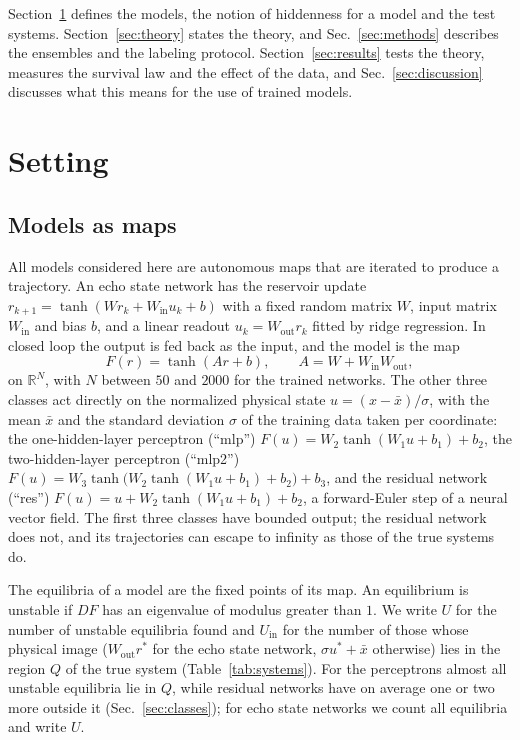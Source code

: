 \documentclass[aip,cha,reprint,amsmath,amssymb,longbibliography]{revtex4-2}
\theoremstyle{definition}
\newcommand{\Uin}{U_{\mathrm{in}}}
\begin{document}
Section~\ref{sec:setting} defines the models, the notion of hiddenness for a model and the test systems.
Section~\ref{sec:theory} states the theory, and Sec.~\ref{sec:methods} describes the ensembles and the labeling protocol.
Section~\ref{sec:results} tests the theory, measures the survival law and the effect of the data, and
Sec.~\ref{sec:discussion} discusses what this means for the use of trained models.

\section{Setting}
\label{sec:setting}

\subsection{Models as maps}
\label{sec:models}

All models considered here are autonomous maps that are iterated to produce a trajectory. An echo state
network\cite{Jaeger2001EchoState,LukoseviciusJaeger2009Reservoir} has the reservoir update
$r_{k+1}=\tanh(Wr_k+W_{\mathrm{in}}u_k+b)$ with a fixed random matrix $W$, input matrix $W_{\mathrm{in}}$ and bias $b$, and
a linear readout $u_k=W_{\mathrm{out}}r_k$ fitted by ridge regression. In closed loop the output is fed back as the input,
and the model is the map
\begin{equation}
F(r)=\tanh(Ar+b),\qquad A=W+W_{\mathrm{in}}W_{\mathrm{out}},
\label{eq:esn}
\end{equation}
on $\mathbb{R}^N$, with $N$ between $50$ and $2000$ for the trained networks. The other three classes act directly on the
normalized physical state
$u=(x-\bar x)/\sigma$, with the mean $\bar x$ and the standard deviation $\sigma$ of the training data taken per
coordinate: the one-hidden-layer perceptron (``mlp'') $F(u)=W_2\tanh(W_1u+b_1)+b_2$, the two-hidden-layer
perceptron (``mlp2'') $F(u)=W_3\tanh\bigl(W_2\tanh(W_1u+b_1)+b_2\bigr)+b_3$, and the residual network (``res'')
$F(u)=u+W_2\tanh(W_1u+b_1)+b_2$, a forward-Euler step of a neural vector
field.\cite{He2016ResNet,E2017Proposal,HaberRuthotto2018Stable} The first three classes have bounded output; the residual
network does not, and its trajectories can escape to infinity as those of the true systems do.

The equilibria of a model are the fixed points of its map. An equilibrium is unstable if $DF$ has an eigenvalue of
modulus greater than $1$. We write $U$ for the number of unstable equilibria found and $\Uin$ for the number of those whose
physical image ($W_{\mathrm{out}}r^*$ for the echo state network, $\sigma u^*+\bar x$ otherwise) lies in the region $Q$ of the
true system (Table~\ref{tab:systems}). For the perceptrons almost all unstable equilibria lie in $Q$, while residual networks
have on average one or two more outside it (Sec.~\ref{sec:classes}); for echo state networks we count all equilibria and
write $U$.
\end{document}
